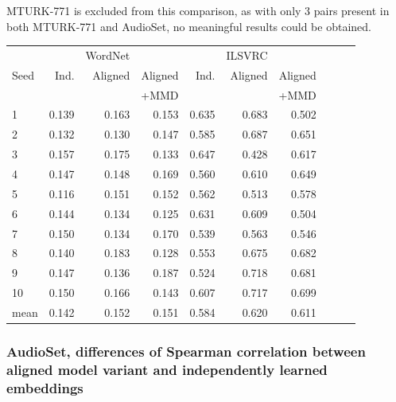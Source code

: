MTURK-771 is excluded from this comparison, as with only 3 pairs present in both MTURK-771 and AudioSet, no meaningful results could be obtained. 

\begin{table}[H]
\begin{tabular}{lrrrrrrrrr}
  \toprule
       &       &   WordNet &           &      &  ILSVRC   &            \\
{Seed} &  Ind. &   Aligned &  Aligned  & Ind. &   Aligned &  Aligned   \\
{}     &       &           & +MMD      &      &           &   +MMD     \\
\midrule
1    &    0.139 &  0.163 &   0.153 &   0.635 &  0.683 &   0.502 &   \\
2    &    0.132 &  0.130 &   0.147 &   0.585 &  0.687 &   0.651 &  \\
3    &    0.157 &  0.175 &   0.133 &   0.647 &  0.428 &   0.617 &  \\
4    &    0.147 &  0.148 &   0.169 &   0.560 &  0.610 &   0.649 &  \\
5    &    0.116 &  0.151 &   0.152 &   0.562 &  0.513 &   0.578 &  \\
6    &    0.144 &  0.134 &   0.125 &   0.631 &  0.609 &   0.504 &  \\
7    &    0.150 &  0.134 &   0.170 &   0.539 &  0.563 &   0.546 &  \\
8    &    0.140 &  0.183 &   0.128 &   0.553 &  0.675 &   0.682 &  \\
9    &    0.147 &  0.136 &   0.187 &   0.524 &  0.718 &   0.681 &  \\
10   &    0.150 &  0.166 &   0.143 &   0.607 &  0.717 &   0.699 &  \\
\midrule                                                                   
mean &    0.142 &  0.152 &   0.151 &   0.584 &  0.620 &   0.611 &  \\
\bottomrule
\end{tabular}
\end{table}



\subsubsection{AudioSet, differences of Spearman correlation between aligned model variant and independently learned embeddings}


